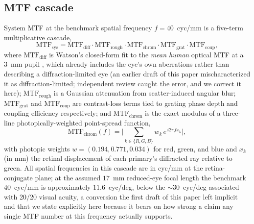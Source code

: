 \documentclass[10pt,twocolumn]{article}
\begin{document}
\subsection{MTF cascade}
System MTF at the benchmark spatial frequency $f=40$~cyc/mm is a
five-term multiplicative cascade,
\begin{equation}
\mathrm{MTF}_{\mathrm{sys}} = \mathrm{MTF}_{\mathrm{diff}} \cdot
\mathrm{MTF}_{\mathrm{rough}} \cdot \mathrm{MTF}_{\mathrm{chrom}} \cdot
\mathrm{MTF}_{\mathrm{grat}} \cdot \mathrm{MTF}_{\mathrm{coup}},
\end{equation}
where $\mathrm{MTF}_{\mathrm{diff}}$ is Watson's closed-form fit to the
\emph{mean human} optical MTF at a 3~mm pupil \cite{watson2013}, which
already includes the eye's own aberrations rather than describing a
diffraction-limited eye (an earlier draft of this paper mischaracterized
it as diffraction-limited; independent review caught the error, and we
correct it here); $\mathrm{MTF}_{\mathrm{rough}}$ is a Gaussian attenuation
from scatter-induced angular blur; $\mathrm{MTF}_{\mathrm{grat}}$ and
$\mathrm{MTF}_{\mathrm{coup}}$ are contrast-loss terms tied to grating phase
depth and coupling efficiency respectively; and
$\mathrm{MTF}_{\mathrm{chrom}}$ is the exact modulus of a three-line
photopically-weighted point-spread function,
\begin{equation}
\mathrm{MTF}_{\mathrm{chrom}}(f) = \Big|\sum_{k\in\{R,G,B\}} w_k\,
e^{\,i 2\pi f x_k}\Big|,
\label{eq:chrom-mtf}
\end{equation}
with photopic weights $w = (0.194, 0.771, 0.034)$ for red, green, and blue
and $x_k$ (in mm) the retinal displacement of each primary's diffracted ray
relative to green. All spatial frequencies in this cascade are in cyc/mm at
the retina-conjugate plane; at the assumed $17$~mm reduced-eye focal length
the benchmark $40$~cyc/mm is approximately $11.6$~cyc/deg, below the
$\sim30$~cyc/deg associated with 20/20 visual acuity, a conversion the
first draft of this paper left implicit and that we state explicitly here
because it bears on how strong a claim any single MTF number at this
frequency actually supports.
\end{document}
